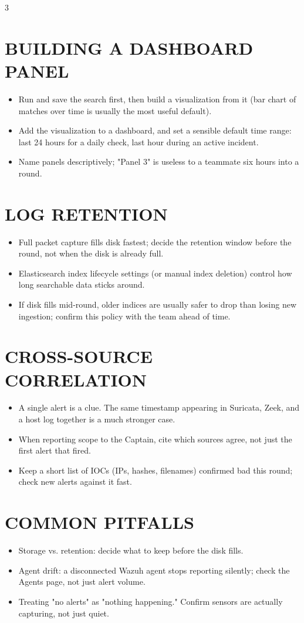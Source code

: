 \documentclass[7pt,landscape]{article}
\begin{document}
\begin{multicols*}{3}
\section{BUILDING A DASHBOARD PANEL}
\begin{itemize}
    \item Run and save the search first, then build a visualization from it (bar chart of matches over time is usually the most useful default).
    \item Add the visualization to a dashboard, and set a sensible default time range: last 24 hours for a daily check, last hour during an active incident.
    \item Name panels descriptively; "Panel 3" is useless to a teammate six hours into a round.
\end{itemize}

\section{LOG RETENTION}
\begin{itemize}
    \item Full packet capture fills disk fastest; decide the retention window before the round, not when the disk is already full.
    \item Elasticsearch index lifecycle settings (or manual index deletion) control how long searchable data sticks around.
    \item If disk fills mid-round, older indices are usually safer to drop than losing new ingestion; confirm this policy with the team ahead of time.
\end{itemize}

\section{CROSS-SOURCE CORRELATION}
\begin{itemize}
    \item A single alert is a clue. The same timestamp appearing in Suricata, Zeek, and a host log together is a much stronger case.
    \item When reporting scope to the Captain, cite which sources agree, not just the first alert that fired.
    \item Keep a short list of IOCs (IPs, hashes, filenames) confirmed bad this round; check new alerts against it fast.
\end{itemize}

\section{COMMON PITFALLS}
\begin{itemize}
    \item Storage vs. retention: decide what to keep before the disk fills.
    \item Agent drift: a disconnected Wazuh agent stops reporting silently; check the Agents page, not just alert volume.
    \item Treating "no alerts" as "nothing happening." Confirm sensors are actually capturing, not just quiet.
\end{itemize}


\end{multicols*}
\end{document}
